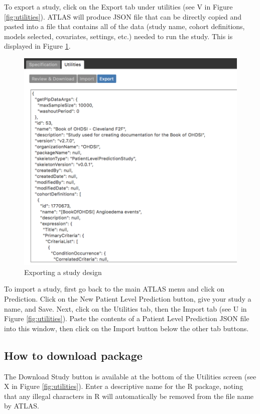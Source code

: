\documentclass[11pt]{book}
\begin{document}
To export a study, click on the Export tab under utilities (see V in
Figure \ref{fig:utilities}). ATLAS will produce JSON file that can be
directly copied and pasted into a file that contains all of the data
(study name, cohort definitions, models selected, covariates, settings,
etc.) needed to run the study. This is displayed in Figure
\ref{fig:export}.

\begin{figure}
\includegraphics[width=1\linewidth]{images/PatientLevelPrediction/atlasImplementation/utilities_export} \caption{Exporting a study design}\label{fig:export}
\end{figure}

To import a study, first go back to the main ATLAS menu and click on
Prediction. Click on the New Patient Level Prediction button, give your
study a name, and Save. Next, click on the Utilities tab, then the
Import tab (see U in Figure \ref{fig:utilities}). Paste the contents of
a Patient Level Prediction JSON file into this window, then click on the
Import button below the other tab buttons.

\subsection{How to download package}\label{how-to-download-package}

The Download Study button is available at the bottom of the Utilities
screen (see X in Figure \ref{fig:utilities}). Enter a descriptive name
for the R package, noting that any illegal characters in R will
automatically be removed from the file name by ATLAS.
\end{document}
